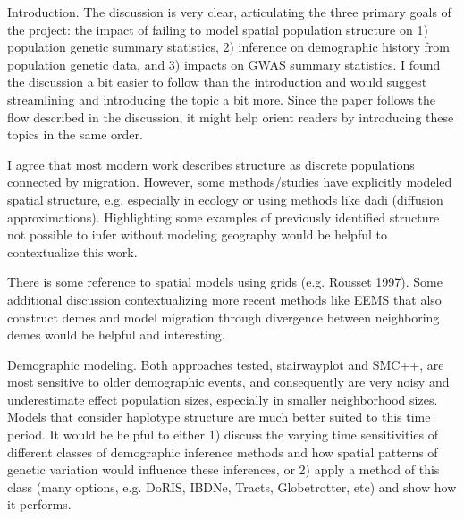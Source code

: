 \begin{point}{}
    Introduction. The discussion is very clear, articulating the three primary goals of the project: the impact of failing to model spatial population structure on 1) population genetic summary statistics, 2) inference on demographic history from population genetic data, and 3) impacts on GWAS summary statistics. I found the discussion a bit easier to follow than the introduction and would suggest streamlining and introducing the topic a bit more. Since the paper follows the flow described in the discussion, it might help orient readers by introducing these topics in the same order.
\end{point}


\begin{point}{}
    I agree that most modern work describes structure as discrete populations connected by migration. However, some methods/studies have explicitly modeled spatial structure, e.g. especially in ecology or using methods like dadi (diffusion approximations). Highlighting some examples of previously identified structure not possible to infer without modeling geography would be helpful to contextualize this work.
\end{point}


\begin{point}{}
    There is some reference to spatial models using grids (e.g. Rousset 1997). Some additional discussion contextualizing more recent methods like EEMS that also construct demes and model migration through divergence between neighboring demes would be helpful and interesting.
\end{point}


\begin{point}{}
    Demographic modeling. Both approaches tested, stairwayplot and SMC++, are most sensitive to older demographic events, and consequently are very noisy and underestimate effect population sizes, especially in smaller neighborhood sizes. Models that consider haplotype structure are much better suited to this time period. It would be helpful to either 1) discuss the varying time sensitivities of different classes of demographic inference methods and how spatial patterns of genetic variation would influence these inferences, or 2) apply a method of this class (many options, e.g. DoRIS, IBDNe, Tracts, Globetrotter, etc) and show how it performs.
\end{point}

